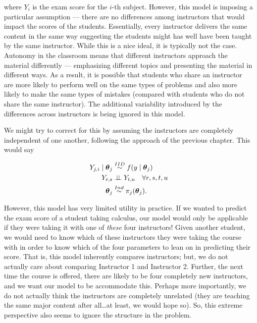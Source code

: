 \documentclass[
  letterpaper,
  DIV=11,
  numbers=noendperiod]{scrreprt}
\theoremstyle{definition}
\theoremstyle{definition}
\theoremstyle{plain}
\theoremstyle{remark}
\begin{document}
where \(Y_i\) is the exam score for the \(i\)-th subject. However, this
model is imposing a particular assumption --- there are no differences
among instructors that would impact the scores of the students.
Essentially, every instructor delivers the same content in the same way
suggesting the students might has well have been taught by the same
instructor. While this is a nice ideal, it is typically not the case.
Autonomy in the classroom means that different instructors approach the
material differently --- emphasizing different topics and presenting the
material in different ways. As a result, it is possible that students
who share an instructor are more likely to perform well on the same
types of problems and also more likely to make the same types of
mistakes (compared with students who do not share the same instructor).
The additional variability introduced by the differences across
instructors is being ignored in this model.

We might try to correct for this by assuming the instructors are
completely independent of one another, following the approach of the
previous chapter. This would say

\[
\begin{aligned}
  Y_{j, i} \mid \boldsymbol{\theta}_j &\stackrel{IID}{\sim} f(y \mid \boldsymbol{\theta}_j) \\
  Y_{r, s} &\perp\negthickspace\negmedspace\perp Y_{t, u} \quad \forall r, s, t, u \\
  \boldsymbol{\theta}_j &\stackrel{Ind}{\sim} \pi_j(\boldsymbol{\theta}_j).
\end{aligned}
\]

However, this model has very limited utility in practice. If we wanted
to predict the exam score of a student taking calculus, our model would
only be applicable if they were taking it with one of \emph{these} four
instructors! Given another student, we would need to know which of these
instructors they were taking the course with in order to know which of
the four parameters to lean on in predicting their score. That is, this
model inherently compares instructors; but, we do not actually care
about comparing Instructor 1 and Instructor 2. Further, the next time
the course is offered, there are likely to be four completely new
instructors, and we want our model to be accommodate this. Perhaps more
importantly, we do not actually think the instructors are completely
unrelated (they are teaching the same major content after all\ldots at
least, we would hope so). So, this extreme perspective also seems to
ignore the structure in the problem.
\end{document}
